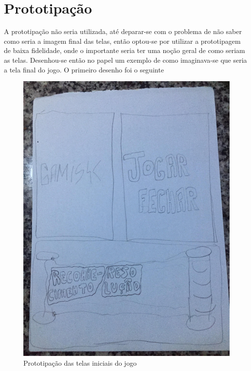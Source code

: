\section[Prototipação]{Prototipação}

A prototipação não seria utilizada, até deparar-se com o problema de não saber como seria a imagem final das telas, então optou-se por utilizar a prototipagem de baixa fidelidade, onde o importante seria ter uma noção geral de como seriam as telas. Desenhou-se então no papel um exemplo de como imaginava-se que seria a tela final do jogo. O primeiro desenho foi o seguinte

\begin{figure}[H]
\centering
\caption{Prototipação das telas iniciais do jogo}
\label{prot0}
\includegraphics[scale=0.14]{figuras/prot0.jpg}
\end{figure}

